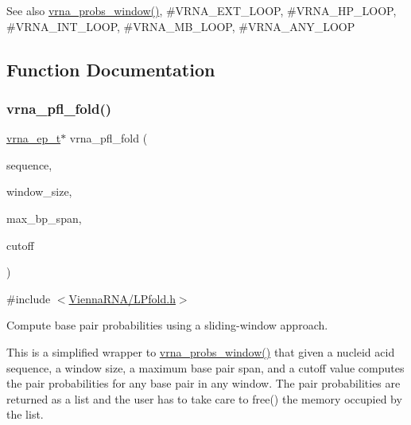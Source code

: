 \begin{DoxySeeAlso}{See also}
\hyperlink{group__local__pf__fold_ga70ec33810fa17a9f67a7c59f156d0137}{vrna\+\_\+probs\+\_\+window()}, \#\+V\+R\+N\+A\+\_\+\+E\+X\+T\+\_\+\+L\+O\+OP, \#\+V\+R\+N\+A\+\_\+\+H\+P\+\_\+\+L\+O\+OP, \#\+V\+R\+N\+A\+\_\+\+I\+N\+T\+\_\+\+L\+O\+OP, \#\+V\+R\+N\+A\+\_\+\+M\+B\+\_\+\+L\+O\+OP, \#\+V\+R\+N\+A\+\_\+\+A\+N\+Y\+\_\+\+L\+O\+OP 
\end{DoxySeeAlso}


\subsection{Function Documentation}
\mbox{\label{group__local__pf__fold_ga6267230f20cab0e2315375310b4dad85}} 
\subsubsection{\texorpdfstring{vrna\+\_\+pfl\+\_\+fold()}{vrna\_pfl\_fold()}}
{\footnotesize\ttfamily \hyperlink{group__struct__utils_gab9ac98ab55ded9fb90043b024b915aca}{vrna\+\_\+ep\+\_\+t}$\ast$ vrna\+\_\+pfl\+\_\+fold (\begin{DoxyParamCaption}\item[{const char $\ast$}]{sequence,  }\item[{int}]{window\+\_\+size,  }\item[{int}]{max\+\_\+bp\+\_\+span,  }\item[{float}]{cutoff }\end{DoxyParamCaption})}



{\ttfamily \#include $<$\hyperlink{LPfold_8h}{Vienna\+R\+N\+A/\+L\+Pfold.\+h}$>$}



Compute base pair probabilities using a sliding-\/window approach. 

This is a simplified wrapper to \hyperlink{group__local__pf__fold_ga70ec33810fa17a9f67a7c59f156d0137}{vrna\+\_\+probs\+\_\+window()} that given a nucleid acid sequence, a window size, a maximum base pair span, and a cutoff value computes the pair probabilities for any base pair in any window. The pair probabilities are returned as a list and the user has to take care to free() the memory occupied by the list.

